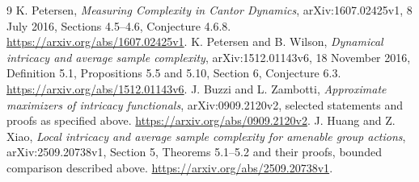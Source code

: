 \documentclass[11pt]{article}
\begin{document}
\begin{thebibliography}{9}
 K. Petersen, \emph{Measuring Complexity in Cantor Dynamics}, arXiv:1607.02425v1, 8 July 2016, Sections 4.5--4.6, Conjecture 4.6.8. \url{https://arxiv.org/abs/1607.02425v1}.
 K. Petersen and B. Wilson, \emph{Dynamical intricacy and average sample complexity}, arXiv:1512.01143v6, 18 November 2016, Definition 5.1, Propositions 5.5 and 5.10, Section 6, Conjecture 6.3. \url{https://arxiv.org/abs/1512.01143v6}.
 J. Buzzi and L. Zambotti, \emph{Approximate maximizers of intricacy functionals}, arXiv:0909.2120v2, selected statements and proofs as specified above. \url{https://arxiv.org/abs/0909.2120v2}.
 J. Huang and Z. Xiao, \emph{Local intricacy and average sample complexity for amenable group actions}, arXiv:2509.20738v1, Section 5, Theorems 5.1--5.2 and their proofs, bounded comparison described above. \url{https://arxiv.org/abs/2509.20738v1}.
\end{thebibliography}
\end{document}
